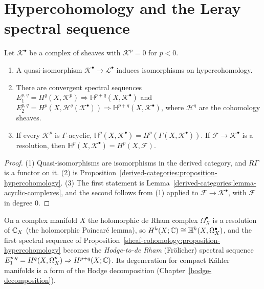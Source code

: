 \section{Hypercohomology and the Leray spectral sequence}\label{sheaf-cohomology:section-hypercohomology}

\begin{proposition}\label{sheaf-cohomology:proposition-hypercohomology}
Let $\mathcal{K}^\bullet$ be a complex of sheaves with $\mathcal{K}^p = 0$ for $p < 0$.
\begin{enumerate}
\item A quasi-isomorphism $\mathcal{K}^\bullet \to \mathcal{L}^\bullet$ induces isomorphisms on hypercohomology.
\item There are convergent spectral sequences $E_1^{p,q} = H^q(X, \mathcal{K}^p) \Rightarrow \mathbb{H}^{p+q}(X, \mathcal{K}^\bullet)$ and
$E_2^{p,q} = H^p(X, \mathcal{H}^q(\mathcal{K}^\bullet)) \Rightarrow \mathbb{H}^{p+q}(X, \mathcal{K}^\bullet)$, where $\mathcal{H}^q$ are the cohomology sheaves.
\item If every $\mathcal{K}^p$ is $\Gamma$-acyclic, $\mathbb{H}^p(X, \mathcal{K}^\bullet) = H^p(\Gamma(X, \mathcal{K}^\bullet))$. If $\mathcal{F} \to \mathcal{K}^\bullet$ is a resolution, then
$\mathbb{H}^p(X, \mathcal{K}^\bullet) = H^p(X, \mathcal{F})$.
\end{enumerate}
\end{proposition}

\begin{proof}
(1) Quasi-isomorphisms are isomorphisms in the derived category, and $R\Gamma$ is a functor on it. (2) is Proposition~\ref{derived-categories:proposition-hypercohomology}.
(3) The first statement is Lemma~\ref{derived-categories:lemma-acyclic-complexes}, and the second follows from (1) applied to $\mathcal{F} \to \mathcal{K}^\bullet$, with $\mathcal{F}$ in degree $0$.
\end{proof}

\begin{remark}\label{sheaf-cohomology:remark-holomorphic-de-rham}
On a complex manifold $X$ the holomorphic de Rham complex $\Omega^\bullet_X$ is a resolution of $\mathbb{C}_X$ (the holomorphic Poincar\'e lemma), so $H^k(X; \mathbb{C}) \cong \mathbb{H}^k(X, \Omega^\bullet_X)$,
and the first spectral sequence of Proposition~\ref{sheaf-cohomology:proposition-hypercohomology} becomes the \emph{Hodge-to-de Rham} (Fr\"olicher) spectral sequence
$E_1^{p,q} = H^q(X, \Omega^p_X) \Rightarrow H^{p+q}(X; \mathbb{C})$. Its degeneration for compact K\"ahler manifolds is a form of the Hodge decomposition
(Chapter~\ref{hodge-decomposition}).
\end{remark}

